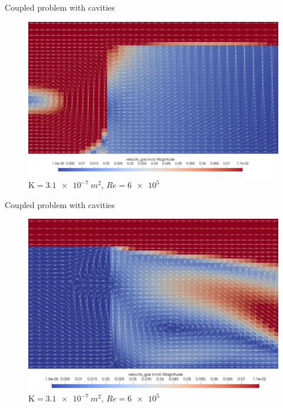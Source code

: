 \documentclass{beamer}
\begin{document}
\begin{frame}{Coupled problem with cavities}
\begin{figure}
	\centering
	\includegraphics[height=0.82\textheight]{coupled_first_cavity.png}
	\caption{\tiny $\mathrm{K}=\SI{3.1e-7}{m^2}$, $Re=\num{6e5}$}
\end{figure}
\end{frame}
\begin{frame}{Coupled problem with cavities}
\begin{figure}
	\centering
	\includegraphics[height=0.82\textheight]{coupled_second_cavity.png}
	\caption{\tiny $\mathrm{K}=\SI{3.1e-7}{m^2}$, $Re=\num{6e5}$}
\end{figure}
\end{frame}
\end{document}
